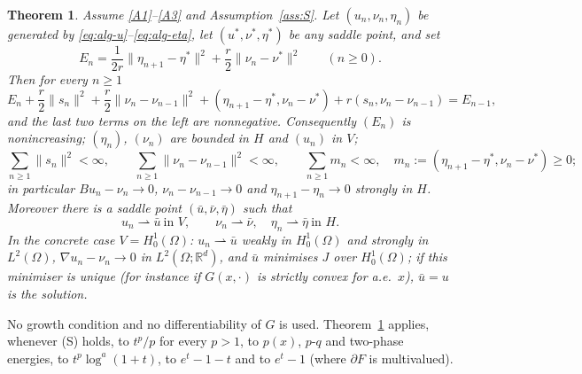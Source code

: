 \documentclass[11pt]{amsart}
\newtheorem{maintheorem}{Theorem}
\theoremstyle{definition}
\theoremstyle{remark}
\numberwithin{equation}{section}
\newcommand{\R}{\mathbb{R}}
\newcommand{\norm}[1]{\lVert #1\rVert}
\newcommand{\weak}{\rightharpoonup}
\begin{document}
\begin{maintheorem}\label{thm:A}
Assume \ref{A1}--\ref{A3} and Assumption~\ref{ass:S}. Let $(u_n,\nu_n,\eta_n)$ be generated by \eqref{eq:alg-u}--\eqref{eq:alg-eta}, let $(u^*,\nu^*,\eta^*)$ be any saddle point, and set
\[
E_n=\frac1{2r}\norm{\eta_{n+1}-\eta^*}^2+\frac r2\norm{\nu_n-\nu^*}^2\qquad(n\ge0).
\]
Then for every $n\ge1$
\begin{equation}\label{eq:lyap}
E_n+\frac r2\norm{s_n}^2+\frac r2\norm{\nu_n-\nu_{n-1}}^2+(\eta_{n+1}-\eta^*,\nu_n-\nu^*)+r(s_n,\nu_n-\nu_{n-1})=E_{n-1},
\end{equation}
and the last two terms on the left are nonnegative. Consequently $(E_n)$ is nonincreasing; $(\eta_n)$, $(\nu_n)$ are bounded in $H$ and $(u_n)$ in $V$;
\[
\sum_{n\ge1}\norm{s_n}^2<\infty,\qquad\sum_{n\ge1}\norm{\nu_n-\nu_{n-1}}^2<\infty,\qquad\sum_{n\ge1}m_n<\infty,\quad m_n:=(\eta_{n+1}-\eta^*,\nu_n-\nu^*)\ge0;
\]
in particular $Bu_n-\nu_n\to0$, $\nu_n-\nu_{n-1}\to0$ and $\eta_{n+1}-\eta_n\to0$ strongly in $H$. Moreover there is a saddle point $(\bar u,\bar\nu,\bar\eta)$ such that
\[
u_n\weak\bar u\ \text{in }V,\qquad\nu_n\weak\bar\nu,\quad\eta_n\weak\bar\eta\ \text{in }H .
\]
In the concrete case $V=H^1_0(\Omega)$: $u_n\weak\bar u$ weakly in $H^1_0(\Omega)$ and strongly in $L^2(\Omega)$, $\nabla u_n-\nu_n\to0$ in $L^2(\Omega;\R^d)$, and $\bar u$ minimises $J$ over $H^1_0(\Omega)$; if this minimiser is unique (for instance if $G(x,\cdot)$ is strictly convex for a.e.\ $x$), $\bar u=u$ is the solution.
\end{maintheorem}

No growth condition and no differentiability of $G$ is used. Theorem~\ref{thm:A} applies, whenever (S) holds, to $t^p/p$ for every $p>1$, to $p(x)$, $p$-$q$ and two-phase energies, to $t^p\log^a(1+t)$, to $e^t-1-t$ and to $e^t-1$ (where $\partial F$ is multivalued).
\end{document}
